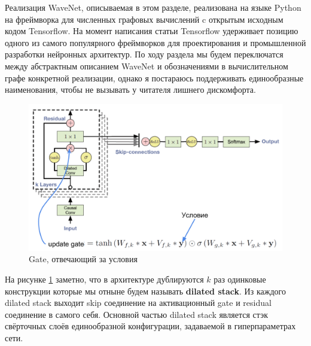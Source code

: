 \documentclass[../diploma.tex]{subfiles}
\begin{document}



Реализация WaveNet, описываемая в этом разделе, реализована на языке Python на фреймворка для численных графовых вычислений c открытым исходным кодом Tensorflow. На момент написания статьи Tensorflow удерживает позицию одного из самого популярного фреймворков для проектирования и промышленной разработки нейронных архитектур.
По ходу раздела мы будем переключатся между абстрактным описанием WaveNet и обозначениями в вычислительном графе конкретной реализации, однако я постараюсь поддерживать единообразные наименования, чтобы не вызывать у читателя лишнего дискомфорта.

\begin{figure}[!htbp]
  \centering
  \includegraphics[scale=0.35]{img/wavenet_arrow}
  \caption{Gate, отвечающий за условия}
  \label{fig:wavenet_arrow}
\end{figure}

На рисунке \ref{fig:wavenet_arrow} заметно, что в архитектуре дублируются $k$ раз одинковые конструкции которые мы отныне будем называть \textbf{dilated stack}. Из каждого dilated stack выходит skip соединение на активационный gate и residual соединение в самого себя. Основной частью dilated stack является стэк свёрточных слоёв единообразной конфигурации, задаваемой в гиперпараметрах сети.
\end{document}
